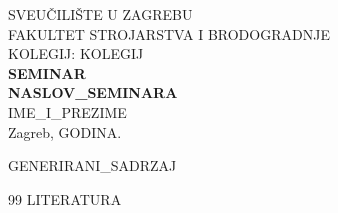 \documentclass[12pt,a4paper]{article}
\begin{document}
\begin{titlepage}
    \begin{center}
        {\large SVEUČILIŠTE U ZAGREBU} \\
        {\large FAKULTET STROJARSTVA I BRODOGRADNJE} \\
        \vspace{6cm}
        {\large KOLEGIJ: {{KOLEGIJ}}} \\
        \vspace{2cm}
        {\Huge \textbf{SEMINAR}} \\
        \vspace{1cm}
        {\Large \textbf{{{NASLOV_SEMINARA}}}} \\
        \vfill
        {\large {{IME_I_PREZIME}}} \\
        \vspace{2cm}
        {\large Zagreb, {{GODINA}}.}
    \end{center}
\end{titlepage}

\tableofcontents
\newpage
\listoffigures
\newpage
\listoftables
\newpage


{{GENERIRANI_SADRZAJ}}

\newpage
\begin{thebibliography}{99}
{{LITERATURA}}
\end{thebibliography}
\end{document}
